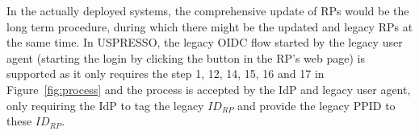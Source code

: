 In the actually deployed systems, the comprehensive update of RPs would be the long term procedure, during which there might be the updated and legacy RPs at the same time. In USPRESSO, the legacy OIDC flow started by the legacy user agent (starting the login by clicking the button in the RP's web page) is supported as it only requires the step 1, 12, 14, 15, 16 and 17 in Figure~\ref{fig:process} and the process is accepted by the IdP and legacy user agent, only requiring the IdP to tag the legacy $ID_{RP}$ and provide the legacy PPID to these $ID_{RP}$.

